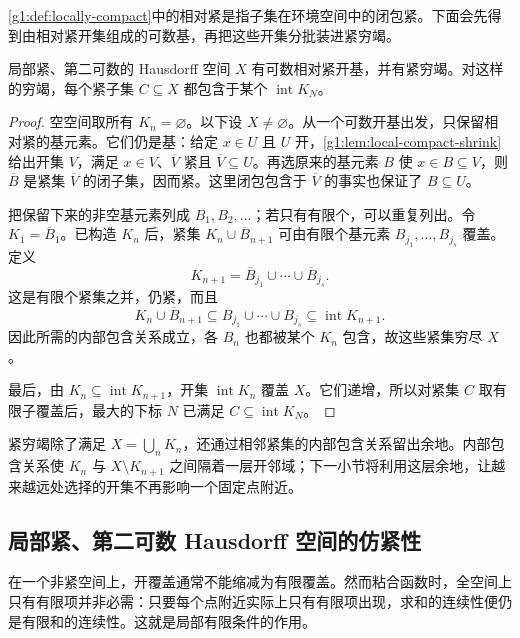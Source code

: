 \cref{g1:def:locally-compact}中的相对紧是指子集在环境空间中的闭包紧。下面会先得到由相对紧开集组成的可数基，再把这些开集分批装进紧穷竭。

\begin{theorem}\label{g1:thm:compact-exhaustion}
	局部紧、第二可数的 Hausdorff 空间 \(X\) 有可数相对紧开基，并有紧穷竭。对这样的穷竭，每个紧子集 \(C\subseteq X\) 都包含于某个 \(\operatorname{int}K_N\)。
\end{theorem}
\begin{proof}
	空空间取所有 \(K_n=\varnothing\)。以下设 \(X\ne\varnothing\)。从一个可数开基出发，只保留相对紧的基元素。它们仍是基：给定 \(x\in U\) 且 \(U\) 开，\cref{g1:lem:local-compact-shrink}给出开集 \(V\)，满足 \(x\in V\)、\(\overline V\) 紧且 \(\overline V\subseteq U\)。再选原来的基元素 \(B\) 使 \(x\in B\subseteq V\)，则 \(\overline B\) 是紧集 \(\overline V\) 的闭子集，因而紧。这里闭包包含于 \(\overline V\) 的事实也保证了 \(B\subseteq U\)。

	把保留下来的非空基元素列成 \(B_1,B_2,\ldots\)；若只有有限个，可以重复列出。令 \(K_1=\overline B_1\)。已构造 \(K_n\) 后，紧集 \(K_n\cup\overline B_{n+1}\) 可由有限个基元素 \(B_{j_1},\ldots,B_{j_s}\) 覆盖。定义
	\[
		K_{n+1}=\overline B_{j_1}\cup\cdots\cup\overline B_{j_s}.
	\]
	这是有限个紧集之并，仍紧，而且
	\[
		K_n\cup\overline B_{n+1}
		\subseteq B_{j_1}\cup\cdots\cup B_{j_s}
		\subseteq\operatorname{int}K_{n+1}.
	\]
	因此所需的内部包含关系成立，各 \(B_n\) 也都被某个 \(K_n\) 包含，故这些紧集穷尽 \(X\)。

	最后，由 \(K_n\subseteq\operatorname{int}K_{n+1}\)，开集 \(\operatorname{int}K_n\) 覆盖 \(X\)。它们递增，所以对紧集 \(C\) 取有限子覆盖后，最大的下标 \(N\) 已满足 \(C\subseteq\operatorname{int}K_N\)。
\end{proof}

紧穷竭除了满足 \(X=\bigcup_nK_n\)，还通过相邻紧集的内部包含关系留出余地。内部包含关系使 \(K_n\) 与 \(X\setminus K_{n+1}\) 之间隔着一层开邻域；下一小节将利用这层余地，让越来越远处选择的开集不再影响一个固定点附近。

\subsection{局部紧、第二可数 Hausdorff 空间的仿紧性}
\label{g1:subsec:0403:03}

在一个非紧空间上，开覆盖通常不能缩减为有限覆盖。然而粘合函数时，全空间上只有有限项并非必需：只要每个点附近实际上只有有限项出现，求和的连续性便仍是有限和的连续性。这就是局部有限条件的作用。

